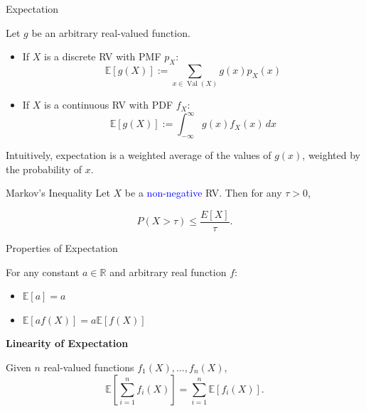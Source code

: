 \documentclass[aspectratio=169,12pt]{beamer}
\DeclareMathOperator{\Val}{Val}
\begin{document}
\begin{frame}[t]{Expectation}
  \vspace{-0.08cm}
  {\scriptsize
  Let $g$ be an arbitrary real-valued function.
  \begin{itemize}
    \setlength{\itemsep}{0.15cm}
    \item If $X$ is a discrete RV with PMF $p_X$:
      \[
        \mathbb{E}[g(X)]:=\sum_{x\in\Val(X)}g(x)p_X(x)
      \]
    \item If $X$ is a continuous RV with PDF $f_X$:
      \[
        \mathbb{E}[g(X)]:=\int_{-\infty}^{\infty}g(x)f_X(x)\,dx
      \]
  \end{itemize}
  Intuitively, expectation is a weighted average of the values of $g(x)$,
  weighted by the probability of $x$. 
  }
  
  
\end{frame}


\begin{frame}{Markov's Inequality}
	Let $X$ be a \textcolor{blue}{non-negative} RV. Then  for any $\tau>0$,
	
	$$P(X>\tau)\leq \frac{E[X]}{\tau}.$$
	
\end{frame}


\begin{frame}[t]{Properties of Expectation}
  \vspace{0.18cm}
  {\small
  For any constant $a\in\mathbb{R}$ and arbitrary real function $f$:
  \begin{itemize}
    \setlength{\itemsep}{0.10cm}
    \item $\mathbb{E}[a]=a$
    \item $\mathbb{E}[af(X)]=a\mathbb{E}[f(X)]$
  \end{itemize}

  \vspace{0.45cm}
  \textbf{Linearity of Expectation}

  Given $n$ real-valued functions $f_1(X),\ldots,f_n(X)$,
  \[
    \mathbb{E}\!\left[\sum_{i=1}^{n}f_i(X)\right]
      =\sum_{i=1}^{n}\mathbb{E}[f_i(X)].
  \]
  }
\end{frame}
\end{document}
